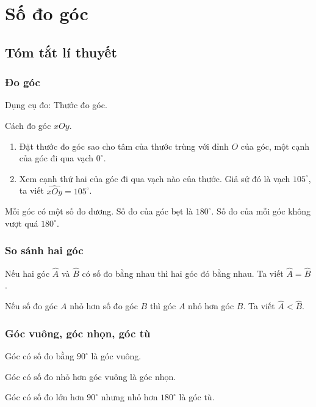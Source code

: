\section{Số đo góc}
\subsection{Tóm tắt lí thuyết}
\subsubsection{Đo góc}
\begin{listEX}
	\item Dụng cụ đo: Thước đo góc.
	\item Cách đo góc $xOy$.
\end{listEX}
\begin{enumerate}[Bước 1.]
	\item Đặt thước đo góc sao cho tâm của thước trùng với đỉnh $O$ của góc, một cạnh của góc đi qua vạch $0^\circ$.
	\item Xem cạnh thứ hai của góc đi qua vạch nào của thước. Giả sử đó là vạch $105^\circ$, ta viết $\widehat{xOy}=105^\circ$.
\end{enumerate}
\begin{note}
	Mỗi góc có một số đo dương. Số đo của góc bẹt là $180^\circ$. Số đo của mỗi góc không vượt quá $180^\circ$.
\end{note}

\subsubsection{So sánh hai góc}
\begin{dn}
	Nếu hai góc $\widehat{A}$ và $\widehat{B}$ có số đo bằng nhau thì hai góc đó bằng nhau. Ta viết $\widehat{A}=\widehat{B}$.
\end{dn}
\begin{dn}
	Nếu số đo góc $A$ nhỏ hơn số đo góc $B$ thì góc $A$ nhỏ hơn góc $B$. Ta viết $\widehat{A}<\widehat{B}$.
\end{dn}

\subsubsection{Góc vuông, góc nhọn, góc tù}
\begin{dn}
	Góc có số đo bằng $90^\circ$ là góc vuông.
\end{dn}
\begin{dn}
	Góc có số đo nhỏ hơn góc vuông là góc nhọn.
\end{dn}
\begin{dn}
	Góc có số đo lớn hơn $90^\circ$ nhưng nhỏ hơn $180^\circ$ là góc tù.
\end{dn}

